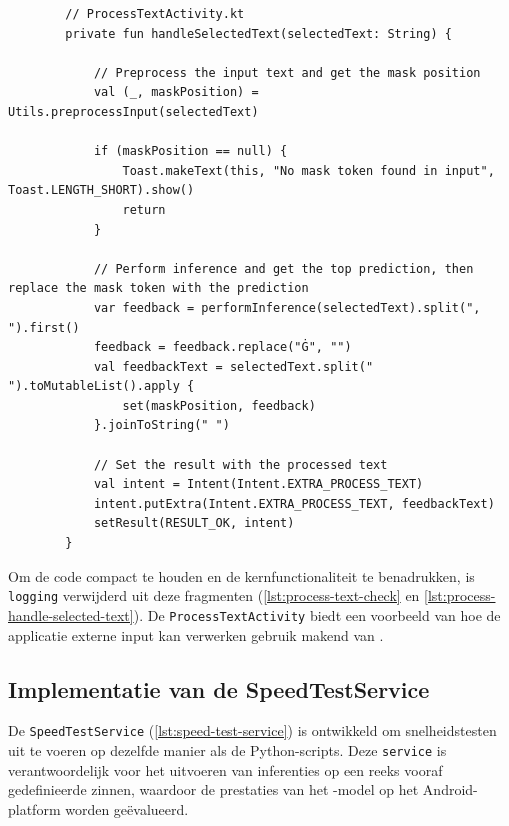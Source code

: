 \begin{listing}
    \begin{verbatim}
        // ProcessTextActivity.kt
        private fun handleSelectedText(selectedText: String) {
            
            // Preprocess the input text and get the mask position
            val (_, maskPosition) = Utils.preprocessInput(selectedText)
            
            if (maskPosition == null) {
                Toast.makeText(this, "No mask token found in input", Toast.LENGTH_SHORT).show()
                return
            }
            
            // Perform inference and get the top prediction, then replace the mask token with the prediction
            var feedback = performInference(selectedText).split(", ").first()
            feedback = feedback.replace("Ġ", "")
            val feedbackText = selectedText.split(" ").toMutableList().apply {
                set(maskPosition, feedback)
            }.joinToString(" ")
            
            // Set the result with the processed text
            val intent = Intent(Intent.EXTRA_PROCESS_TEXT)
            intent.putExtra(Intent.EXTRA_PROCESS_TEXT, feedbackText)
            setResult(RESULT_OK, intent)
        }
    \end{verbatim}
    \caption[\texttt{ProcessTextActivity.kt} (deel 2)]{Het tweede deel van \texttt{ProcessTextActivity.kt} verwerkt de geselecteerde tekst en past inferentie toe om de gemaskeerde woorden te voorspellen en te vervangen.}
    \label{lst:process-handle-selected-text}
\end{listing}

Om de code compact te houden en de kernfunctionaliteit te benadrukken, is \texttt{logging} verwijderd uit deze fragmenten (\ref{lst:process-text-check} en \ref{lst:process-handle-selected-text}). De \texttt{ProcessTextActivity} biedt een voorbeeld van hoe de applicatie externe input kan verwerken gebruik makend van .

\subsection{Implementatie van de SpeedTestService}

De \texttt{SpeedTestService} (\ref{lst:speed-test-service}) is ontwikkeld om snelheidstesten uit te voeren op dezelfde manier als de Python-scripts. Deze \texttt{service} is verantwoordelijk voor het uitvoeren van inferenties op een reeks vooraf gedefinieerde zinnen, waardoor de prestaties van het -model op het Android-platform worden geëvalueerd.

